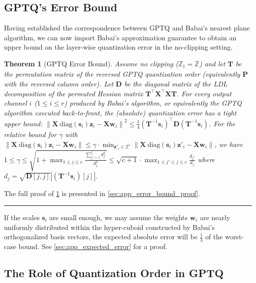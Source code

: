 \documentclass{article} %
\newcommand{\BlackBox}{\rule{1.5ex}{1.5ex}}  %
\renewenvironment{proof}{\par\noindent{\bf Proof\ }}{\hfill\BlackBox\par}
\newenvironment{proof}{\par\noindent{\bf Proof\ }}{\hfill\BlackBox\par}
\newtheorem{theorem}{Theorem}
\begin{document}
\subsection{GPTQ's Error Bound}
\label{sec:error_bound}

Having established the correspondence between GPTQ and Babai's nearest plane algorithm, we can now import Babai's approximation guarantee to obtain an upper bound on the layer-wise quantization error in the no-clipping setting.

\begin{theorem}[GPTQ Error Bound]
\label{thm:error_bound}
Assume no clipping ($\mathbb{Z}_{\dagger}=\mathbb{Z}$) and let $\bm{T}$ be the permutation matrix of the reversed GPTQ quantization order (equivalently $\bm{P}$ with the reversed column order). Let $\bm{D}$ be the diagonal matrix of the LDL decomposition of the permuted Hessian matrix $\bm{T}^\top \bm{X}^\top \bm{X} \bm{T}$.
For every output channel $i$ ($1 \le i \le r$) produced by Babai's algorithm, or equivalently the GPTQ algorithm executed back-to-front, the (absolute) quantization error has a tight upper bound: $\left\| \bm{X} \mathrm{\ diag} \left( \bm{s}_{i} \right) \bm{z}_{i} - \bm{X} \bm{w}_{i} \right\|^{2} \le \frac{1}{4} \left( \bm{T}^{-1} \bm{s}_{i} \right)^\top \bm{D} \left( \bm{T}^{-1} \bm{s}_{i} \right)$.
For the relative bound for $\gamma$ with $\left\| \bm{X} \mathrm{\ diag} \left( \bm{s}_{i} \right) \bm{z}_{i} - \bm{X} \bm{w}_{i} \right\| \le \gamma \cdot \min_{\bm{z}'_{i} \in \mathbb{Z}^{c}} \left\| \bm{X} \mathrm{\ diag} \left( \bm{s}_{i} \right) \bm{z}'_{i} - \bm{X} \bm{w}_{i} \right\|$, we have $
1 \le \gamma \le \sqrt{1 + \max_{1 \le j \le c} \frac{\sum_{j'=1}^{j} d_{j'}^{2}}{d_{j}^{2}}}
\le \sqrt{c + 1} \cdot \max_{1 \le j' \le j \le c} \frac{d_{j'}}{d_{j}}
$ where $d_{j} = \sqrt{\bm{D} [j, j]} \left| \left( \bm{T}^{-1} \bm{s}_{i} \right) [j] \right|$.
\end{theorem}
\begin{proof}
The full proof of \cref{thm:error_bound} is presented in \cref{sec:app_error_bound_proof}.
\end{proof}

If the scales $\bm{s}_{i}$ are small enough, we may assume the weights $\bm{w}_{i}$ are nearly uniformly distributed within the hyper-cuboid constructed by Babai's orthogonalized basis vectors, the expected absolute error will be $\frac{1}{3}$ of the worst-case bound. See \cref{sec:app_expected_error} for a proof.

\subsection{The Role of Quantization Order in GPTQ}
\label{sec:quant_order}
\end{document}
